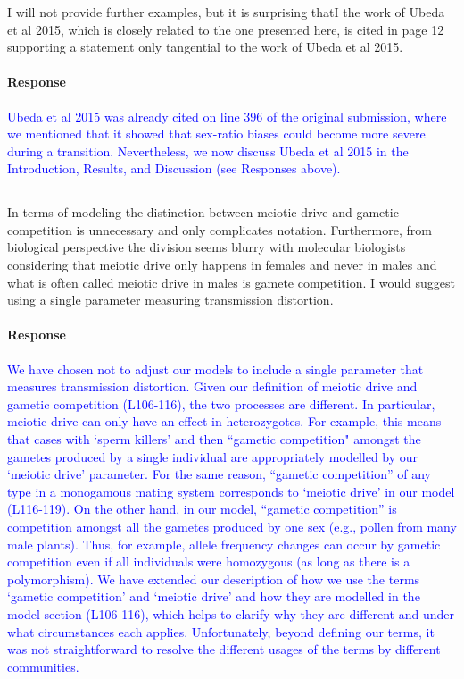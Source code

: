 \documentclass[10pt,letterpaper]{article}
\begin{document}
\noindent\subsubsection{}
I will not provide further examples, but it is surprising thatI the work of Ubeda et al 2015, which is closely related to the one presented here, is cited in page 12 supporting a statement only tangential to the work of Ubeda et al 2015.

\noindent\paragraph{Response}
\textcolor{blue}{Ubeda et al 2015 was already cited on line 396 of the original submission, where we mentioned that it showed that sex-ratio biases could become more severe during a transition.
Nevertheless, we now discuss Ubeda et al 2015 in the Introduction, Results, and Discussion (see Responses above).}

\noindent\subsection{}
In terms of modeling the distinction between meiotic drive and gametic competition is unnecessary and only complicates notation. Furthermore, from biological perspective the division seems blurry with molecular biologists considering that meiotic drive only happens in females and never in males and what is often called meiotic drive in males is gamete competition. I would suggest using a single parameter measuring transmission distortion.

\noindent\paragraph{Response}
\textcolor{blue}{
We have chosen not to adjust our models to include a single parameter that measures transmission distortion. 
Given our definition of meiotic drive and gametic competition (L106-116), the two processes are different.
In particular, meiotic drive can only have an effect in heterozygotes.
For example, this means that cases with `sperm killers' and then ``gametic competition" amongst the gametes produced by a single individual are appropriately modelled by our `meiotic drive' parameter. 
For the same reason, ``gametic competition'' of any type in a monogamous mating system corresponds to `meiotic drive' in our model (L116-119). 
On the other hand, in our model, ``gametic competition'' is competition amongst all the gametes produced by one sex (e.g., pollen from many male plants).
Thus, for example, allele frequency changes can occur by gametic competition even if all individuals were homozygous (as long as there is a polymorphism).
We have extended our description of how we use the terms `gametic competition' and `meiotic drive' and how they are modelled in the model section (L106-116), which helps to clarify why they are different and under what circumstances each applies. 
Unfortunately, beyond defining our terms, it was not straightforward to resolve the different usages of the terms by different communities.
}
\end{document}
